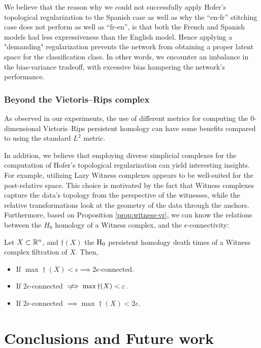 \documentclass[../main.tex]{subfiles}
\begin{document}
We believe that the reason why we could not successfully apply Hofer's topological regularization to the Spanish case as well as why the ``en-fr'' stitching case does not perform as well as ``fr-en'', is that both the French and Spanish models had less expressiveness than the English model. Hence applying a "demanding" regularization prevents the network from obtaining a proper latent space for the classification class. In other words, we encounter an imbalance in the bias-variance tradeoff, with excessive bias hampering the network's performance.


\subsection{Beyond the Vietoris–Rips complex}
As observed in our experiments, the use of different metrics for computing the 0-dimensional Vietoris–Rips persistent homology can have some benefits compared to using the standard $L^2$ metric.

In addition, we believe that employing diverse simplicial complexes for the computation of Hofer's topological regularization can yield interesting insights. For example, utilizing Lazy Witness complexes appears to be well-suited for the post-relative space. This choice is motivated by the fact that Witness complexes capture the data's topology from the perspective of the witnesses, while the relative transformations look at the geometry of the data through the anchors.\\

Furthermore, based on Proposition \ref{prop:witness-vr}, we can know the relations between the $H_0$ homology of a Witness complex, and the $\epsilon$-connectivity:
\begin{corollary}
Let $X\subset \mathbb{R}^n$, and $\dag(X)$ the $\text{\rm H}_0$ persistent homology death times of a Witness complex filtration of $X$. Then,
\begin{itemize}
    \item If $\max \dag(X) < \epsilon \implies 2\epsilon$-connected.
    \item If $2\epsilon$-connected $\notimplies \max \dag(X) < \epsilon$.
    \item If $2\epsilon$-connected $\implies \max \dag(X) < 2\epsilon$.
\end{itemize}
\end{corollary}



\cleardoublepage
\chapter{Conclusions and Future work}
\label{ch:conclusionsAndFutureWork}
\end{document}
